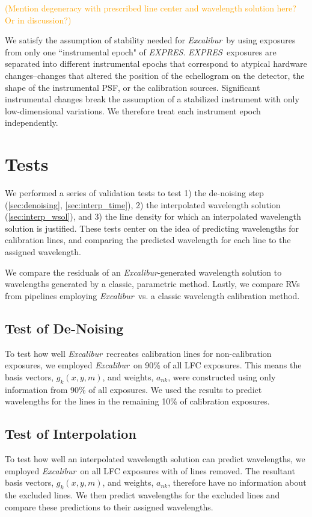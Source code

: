 \documentclass[twocolumn]{aastex63}
\newcommand{\lz}[1]{\textcolor{orange}{#1}}
\newcommand{\project}[1]{\textsl{#1}}
\newcommand{\name}{\project{Excalibur}}
\newcommand{\acronym}[1]{{\small{#1}}}
\newcommand{\expres}{\project{\acronym{EXPRES}}}
\begin{document}
 \lz{(Mention degeneracy with prescribed line center and wavelength solution here?  Or in discussion?)}
 
 We satisfy the assumption of stability needed for \name\ by using exposures from only one ``instrumental epoch" of \expres.  \expres\ exposures are separated into different instrumental epochs that correspond to atypical hardware changes--changes that altered the position of the echellogram on the detector, the shape of the instrumental PSF, or the calibration sources.  Significant instrumental changes break the assumption of a stabilized instrument with only low-dimensional variations.  We therefore treat each instrument epoch independently.


\section{Tests}
We performed a series of validation tests to test 1) the de-noising step (\textsection \ref{sec:denoising}, \textsection\ref{sec:interp_time}), 2) the interpolated wavelength solution (\textsection \ref{sec:interp_wsol}), and 3) the line density for which an interpolated wavelength solution is justified.  These tests center on the idea of predicting wavelengths for calibration lines, and comparing the predicted wavelength for each line to the assigned wavelength.

We compare the residuals of an \name -generated wavelength solution to wavelengths generated by a classic, parametric method.  Lastly, we compare RVs from pipelines employing \name\ vs. a classic wavelength calibration method.

\subsection{Test of De-Noising}\label{sec:test-denoising}
To test how well \name\ recreates calibration lines for non-calibration exposures, we employed \name\ on 90\% of all LFC exposures.  This means the basis vectors, $g_k(x,y,m)$,  and weights, $a_{nk}$, were constructed using only information from 90\% of all exposures.  We used the results to predict wavelengths for the lines in the remaining 10\% of calibration exposures.


\subsection{Test of Interpolation}\label{sec:test-interp}
To test how well an interpolated wavelength solution can predict wavelengths, we employed \name\ on all LFC exposures with 
of lines removed.  The resultant basis vectors, $g_k(x,y,m)$,  and weights, $a_{nk}$, therefore have no information about the excluded lines.  We then predict wavelengths for the excluded lines and compare these predictions to their assigned wavelengths.
\end{document}
